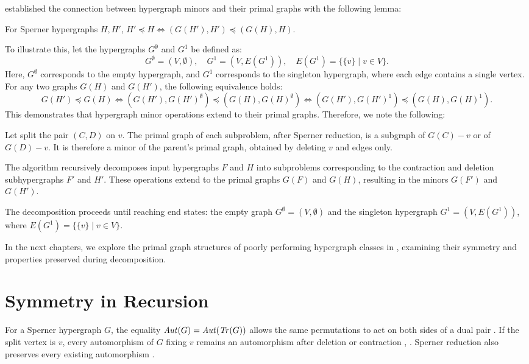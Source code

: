 \cite{AGT12} established the connection between hypergraph minors and their primal graphs with the following lemma:

\begin{lemma}
For Sperner hypergraphs $H,H'$, $H'\preceq H\iff(G(H'),H')\preceq(G(H),H)$.
\end{lemma}

To illustrate this, let the hypergraphs $G^{\emptyset}$ and $G^1$ be defined as:
\[
G^{\emptyset}=(V,\emptyset),\quad G^1=(V,E(G^1)),\quad E(G^1)=\{\{v\}\mid v\in V\}.
\]
Here, $G^{\emptyset}$ corresponds to the empty hypergraph, and $G^1$ corresponds to the singleton hypergraph, where each edge contains a single vertex. For any two graphs $G(H)$ and $G(H')$, the following equivalence holds:
\[
G(H')\preceq G(H)\iff(G(H'),G(H')^{\emptyset})\preceq(G(H),G(H)^{\emptyset})\iff(G(H'),G(H')^1)\preceq(G(H),G(H)^1).
\]
This demonstrates that hypergraph minor operations extend to their primal graphs. Therefore, we note the following:

\begin{observation}
Let \FKA{} split the pair $(C,D)$ on $v$. The primal graph of each subproblem, after Sperner reduction, is a subgraph of $G(C)-v$ or of $G(D)-v$. It is therefore a minor of the parent's primal graph, obtained by deleting $v$ and edges only.
\end{observation}

The \FKA{} algorithm recursively decomposes input hypergraphs $F$ and $H$ into subproblems corresponding to the contraction and deletion subhypergraphs $F'$ and $H'$. These operations extend to the primal graphs $G(F)$ and $G(H)$, resulting in the minors $G(F')$ and $G(H')$.

The decomposition proceeds until reaching end states: the empty graph $G^{\emptyset}=(V,\emptyset)$ and the singleton hypergraph $G^1=(V,E(G^1))$, where $E(G^1)=\{\{v\}\mid v\in V\}$.

In the next chapters, we explore the primal graph structures of poorly performing hypergraph classes in \FKA, examining their symmetry and properties preserved during decomposition.

\section{Symmetry in \FKA{} Recursion}

For a Sperner hypergraph $G$, the equality $\mathit{Aut}(G)=\mathit{Aut}(\mathit{Tr}(G))$
allows the same permutations to act on both sides of a dual pair
. If the split vertex is $v$, every automorphism
of $G$ fixing $v$ remains an automorphism after deletion or contraction
, . Sperner reduction
also preserves every existing automorphism .

